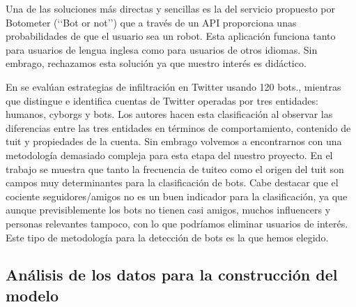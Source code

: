 Una de las soluciones más directas y sencillas es la del servicio propuesto por Botometer 
(\lq\lq Bot or not\rq\rq) que a través de un API proporciona unas probabilidades de que el usuario 
sea un robot. Esta aplicación funciona tanto para usuarios de lengua inglesa como para usuarios 
de otros idiomas. Sin embrago, rechazamos esta solución ya que nuestro interés es didáctico. 

En  \cite{bots1} se evalúan estrategias de infiltración en Twitter usando 120 bots.,
mientras que  \cite{user_class4} distingue e identifica cuentas de Twitter operadas por tres 
entidades: humanos, cyborgs y bots. Los autores hacen esta clasificación al observar las diferencias 
entre las tres entidades en términos de comportamiento, contenido de tuit y propiedades de la cuenta.
Sin embrago volvemos a encontrarnos con una metodología demasiado compleja para esta etapa del nuestro 
proyecto. En el trabajo \cite{user_class6} se muestra que tanto la frecuencia de tuiteo como el origen 
del tuit son campos muy determinantes para la clasificación de bots. Cabe destacar que el cociente 
seguidores/amigos no es un buen indicador para la clasificación, ya que aunque previsiblemente los bots 
no tienen casi amigos, muchos influencers y personas relevantes tampoco, con lo que podríamos eliminar
usuarios de interés. Este tipo de metodología para la detección de bots es la que hemos elegido.

\subsection{Análisis de los datos para la construcción del modelo}

